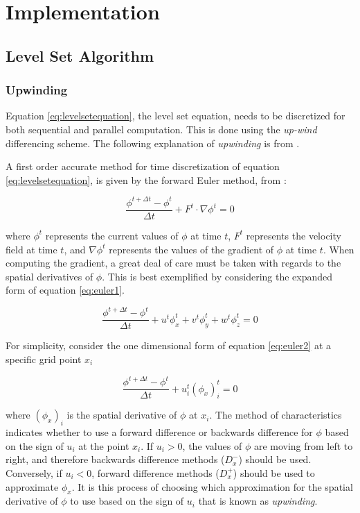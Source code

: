\chapter{Implementation}

\section{Level Set Algorithm}\label{levelsetalgorithm}

\subsection{Upwinding}
Equation \eqref{eq:levelsetequation}, the level set equation, needs to be discretized for both sequential and parallel computation. This is done using the \textit{up-wind} differencing scheme. The following explanation of \textit{upwinding} is from \cite{osher2003lsm}.

A first order accurate method for time discretization of equation \eqref{eq:levelsetequation}, is given by the forward Euler method, from \cite{osher2003lsm}:

\begin{equation}
\frac{\phi^{t+\Delta t}-\phi^t}{\Delta t} +F^{t}\cdot{\nabla{\phi^{t}}} = 0
\label{eq:euler1}
\end{equation}

where $\phi^{t}$ represents the current values of $\phi$ at time $t$, $F^{t}$ represents the velocity field at time $t$, and  $\nabla{\phi^{t}}$ represents the values of the gradient of $\phi$ at time $t$. When computing the gradient, a great deal of care must be taken with regards to the spatial derivatives of $\phi$. This is best exemplified by considering the expanded form of equation \eqref{eq:euler1}.

\begin{equation}
\frac{\phi^{t+\Delta t}-\phi^t}{\Delta t} +u^{t}\phi_x^t+v^{t}\phi_y^t+w^{t}\phi_z^t = 0
\label{eq:euler2}
\end{equation}

For simplicity, consider the one dimensional form of equation \eqref{eq:euler2} at a specific grid point $x_i$ 

\begin{equation}
\frac{\phi^{t+\Delta t}-\phi^t}{\Delta t} +u_i^{t}(\phi_x)_i^t = 0
\label{eq:euler3}
\end{equation}

where $(\phi_x)_i$ is the spatial derivative of $\phi$ at $x_i$. The method of characteristics indicates whether to use a forward difference or backwards difference for $\phi$ based on the sign of $u_i$ at the point $x_i$. If $u_i > 0$, the values of $\phi$ are moving from left to right, and therefore backwards difference methods ($D_x^-$) should be used. Conversely, if $u_i<0$, forward difference methods ($D_x^+$) should be used to approximate $\phi_x$. It is this process of choosing which approximation for the spatial derivative of $\phi$ to use based on the sign of $u_i$ that is known as \textit{upwinding}. 

